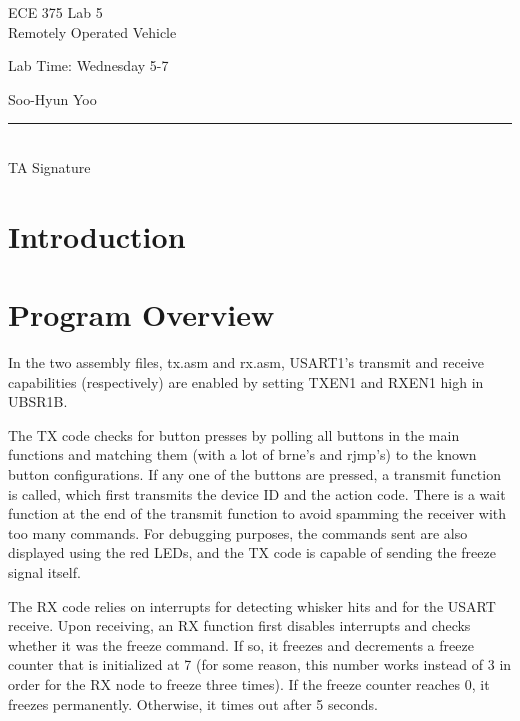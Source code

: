 \documentclass[12pt,letterpaper]{article}
\begin{document}
\begin{titlepage}
    \vspace*{4cm}
    \begin{flushright}
    {\huge
        ECE 375 Lab 5\\[1cm]
    }
    {\large
        Remotely Operated Vehicle
    }
    \end{flushright}
    \begin{flushleft}
    Lab Time: Wednesday 5-7
    \end{flushleft}
    \begin{flushright}
    Soo-Hyun Yoo

    \vfill
    \rule{5in}{.5mm}\\
    TA Signature
    \end{flushright}

\end{titlepage}

\section*{Introduction}


\section*{Program Overview}

In the two assembly files, tx.asm and rx.asm, USART1's transmit and receive
capabilities (respectively) are enabled by setting TXEN1 and RXEN1 high in
UBSR1B.

The TX code checks for button presses by polling all buttons in the main
functions and matching them (with a lot of brne's and rjmp's) to the known
button configurations. If any one of the buttons are pressed, a transmit
function is called, which first transmits the device ID and the action code.
There is a wait function at the end of the transmit function to avoid spamming
the receiver with too many commands. For debugging purposes, the commands sent
are also displayed using the red LEDs, and the TX code is capable of sending
the freeze signal itself.

The RX code relies on interrupts for detecting whisker hits and for the USART
receive. Upon receiving, an RX function first disables interrupts and checks
whether it was the freeze command. If so, it freezes and decrements a freeze
counter that is initialized at 7 (for some reason, this number works instead of
3 in order for the RX node to freeze three times). If the freeze counter
reaches 0, it freezes permanently. Otherwise, it times out after 5 seconds.
\end{document}
